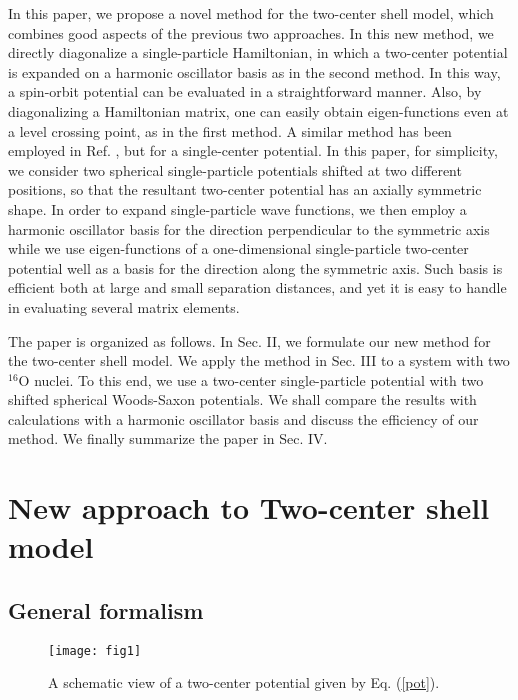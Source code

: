 \documentclass[superscriptaddress,twocolumn,amsmath,amssymb]{revtex4}
\begin{document}
In this paper, we propose a novel method for the two-center shell model, 
which combines good aspects of the previous two approaches. In this new method, 
we directly diagonalize a single-particle Hamiltonian, in which  
a two-center potential is expanded on a harmonic oscillator basis  
as in the second method. In this way, a spin-orbit potential can 
be evaluated in a straightforward manner. Also, by diagonalizing a Hamiltonian matrix, 
one can easily 
obtain eigen-functions even at a level crossing point, as in the first 
method. 
A similar method has been employed in Ref. \cite{Diaz-Torres04-2}, but 
for a single-center potential.
In this paper, for simplicity, we consider two spherical 
single-particle potentials shifted at two different positions, so that 
the resultant two-center potential has an axially symmetric shape. 
In order to expand single-particle wave functions, we then employ 
a harmonic oscillator basis for the direction perpendicular to the 
symmetric axis while we use eigen-functions of a one-dimensional 
single-particle two-center 
potential well as a basis for the direction along the symmetric axis. 
Such basis is efficient both at large and small separation 
distances, and yet it is 
easy to handle in evaluating several matrix elements. 

The paper is organized as follows. In Sec. II, we formulate our 
new method for the two-center shell model. We apply the method in 
Sec. III to a system with two $^{16}$O nuclei. To this end, 
we use a two-center 
single-particle potential with two shifted spherical Woods-Saxon 
potentials. We shall compare the results with calculations with a harmonic oscillator 
basis and discuss the efficiency of our method. We finally summarize 
the paper in Sec. IV. 

\section{New approach to Two-center shell model}

\subsection{General formalism}

\begin{figure}[t]
\texttt{[image: fig1]}
\caption{A schematic view of a two-center potential given by 
Eq. (\ref{pot}). }
\end{figure}
\end{document}
